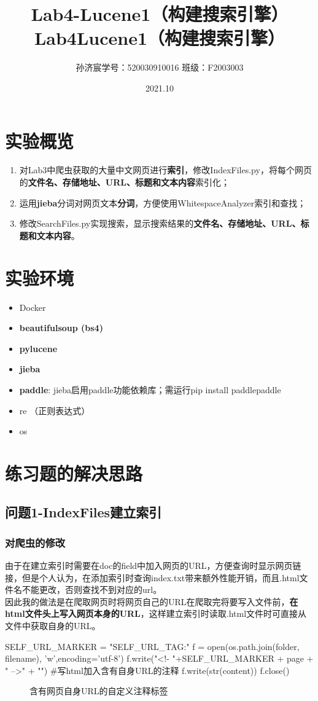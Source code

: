 \documentclass[12pt,a4paper]{article}
\title{Lab4-Lucene1（构建搜索引擎）}
\title{Lab4\quad Lucene1（构建搜索引擎）}
\date{2021.10}
\author{孙济宸\quad \quad 学号：520030910016 \quad  \quad 班级：F2003003}
\begin{document}
\maketitle
\section{实验概览}
\begin{enumerate}
	\item 对Lab3中爬虫获取的大量中文网页进行\textbf{索引}，修改IndexFiles.py，将每个网页的\textbf{文件名、存储地址、URL、标题和文本内容}索引化；
	\item 运用\textbf{jieba}分词对网页文本\textbf{分词}，方便使用WhitespaceAnalyzer索引和查找；
	\item 修改SearchFiles.py实现搜索，显示搜索结果的\textbf{文件名、存储地址、URL、标题和文本内容}。
\end{enumerate}
\section{实验环境}
\begin{itemize}
	\item Docker
	\item \textbf{beautifulsoup (bs4)}
	\item \textbf{pylucene}
	\item \textbf{jieba}
	\item \textbf{paddle}: jieba启用paddle功能依赖库；需运行pip install paddlepaddle
	\item re （正则表达式）
	\item os

\end{itemize}
\newpage

\section{练习题的解决思路}
\subsection{问题1-IndexFiles建立索引}
\subsubsection{对爬虫的修改} \label{addhtml}
由于在建立索引时需要在doc的field中加入网页的URL，方便查询时显示网页链接，但是个人认为，在添加索引时查询index.txt带来额外性能开销，而且.html文件名不能更改，否则查找不到对应的url。
\\因此我的做法是在爬取网页时将网页自己的URL在爬取完将要写入文件前，\textbf{在html文件头上写入网页本身的URL}，这样建立索引时读取.html文件时可直接从文件中获取自身的URL。
\begin{python}
SELF_URL_MARKER  = "SELF_URL_TAG:"
f = open(os.path.join(folder, filename), 'w',encoding='utf-8')
f.write("<!- "+SELF_URL_MARKER + page + " -->" + "\n")  
#写html加入含有自身URL的注释
f.write(str(content))
f.close()
\end{python}
\begin{figure}[H]
	\centering
	 \caption{含有网页自身URL的自定义注释标签}
\end{figure}
\end{document}
